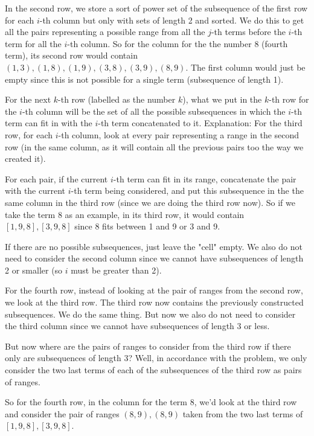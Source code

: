 \documentclass[11pt,letterpaper]{article}
\begin{document}
		In the second row, we store a sort of power set of the subsequence of the first row for each $i$-th column but only with sets of length 2 and sorted.
		We do this to get all the pairs representing a possible range from all the $j$-th terms before the $i$-th term for all the $i$-th column.
		So for the column for the the number 8 (fourth term), its second row would contain $(1,3), (1,8), (1,9), (3,8), (3,9), (8,9)$.
		The first column would just be empty since this is not possible for a single term (subsequence of length 1).
		
		For the next $k$-th row (labelled as the number $k$), what we put in the $k$-th row for the $i$-th column will be the set of all the possible subsequences in which the $i$-th term can fit in with the $i$-th term concatenated to it.
		\newline\newline
		Explanation:
		\newline\newline
		For the third row, for each $i$-th column, look at every pair representing a range in the second row (in the same column, as it will contain all the previous pairs too the way we created it).
		
		For each pair, if the current $i$-th term can fit in its range, concatenate the pair with the current $i$-th term being considered, and put this subsequence in the the same column in the third row (since we are doing the third row now).
		So if we take the term 8 as an example, in its third row, it would contain $[1,9,8], [3,9,8]$ since 8 fits between 1 and 9 or 3 and 9.
		
		If there are no possible subsequences, just leave the "cell" empty.
		We also do not need to consider the second column since we cannot have subsequences of length 2 or smaller (so $i$ must be greater than 2).
		
		For the fourth row, instead of looking at the pair of ranges from the second row, we look at the third row.
		The third row now contains the previously constructed subsequences.
		We do the same thing.
		But now we also do not need to consider the third column since we cannot have subsequences of length 3 or less.
		
		But now where are the pairs of ranges to consider from the third row if there only are subsequences of length 3?
		Well, in accordance with the problem, we only consider the two last terms of each of the subsequences of the third row as pairs of ranges.
		
		So for the fourth row, in the column for the term 8, we'd look at the third row and consider the pair of ranges $(8,9), (8,9)$ taken from the two last terms of $[1,9,8], [3,9,8]$.
		
\end{document}
